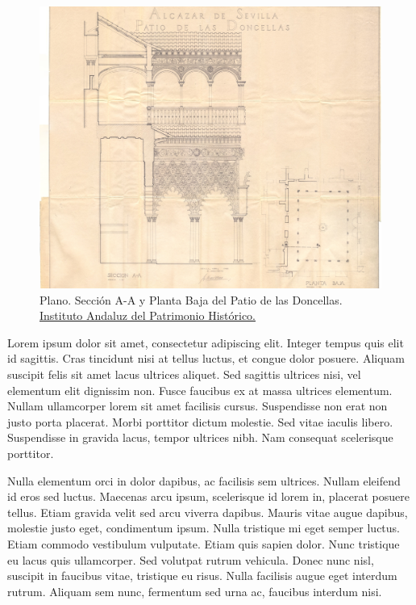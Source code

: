 \begin{landscape}
    \begin{figure}[p]
        \centering
        \includegraphics[width=0.69\linewidth]{figures/examples/patiodoncellas.jpg}
        \caption[Plano. Sección A-A y Planta Baja del Patio de las Doncellas.]{Plano. Sección A-A y Planta Baja del Patio de las Doncellas. \href{https://hdl.handle.net/11532/333959}{Instituto Andaluz del Patrimonio Histórico.}}
        \label{fig:gantt}
    \end{figure}
\end{landscape}



Lorem ipsum dolor sit amet, consectetur adipiscing elit. Integer tempus quis elit id sagittis. Cras tincidunt nisi at tellus luctus, et congue dolor posuere. Aliquam suscipit felis sit amet lacus ultrices aliquet. Sed sagittis ultrices nisi, vel elementum elit dignissim non. Fusce faucibus ex at massa ultrices elementum. Nullam ullamcorper lorem sit amet facilisis cursus. Suspendisse non erat non justo porta placerat. Morbi porttitor dictum molestie. Sed vitae iaculis libero. Suspendisse in gravida lacus, tempor ultrices nibh. Nam consequat scelerisque porttitor.

Nulla elementum orci in dolor dapibus, ac facilisis sem ultrices. Nullam eleifend id eros sed luctus. Maecenas arcu ipsum, scelerisque id lorem in, placerat posuere tellus. Etiam gravida velit sed arcu viverra dapibus. Mauris vitae augue dapibus, molestie justo eget, condimentum ipsum. Nulla tristique mi eget semper luctus. Etiam commodo vestibulum vulputate. Etiam quis sapien dolor. Nunc tristique eu lacus quis ullamcorper. Sed volutpat rutrum vehicula. Donec nunc nisl, suscipit in faucibus vitae, tristique eu risus. Nulla facilisis augue eget interdum rutrum. Aliquam sem nunc, fermentum sed urna ac, faucibus interdum nisi.


